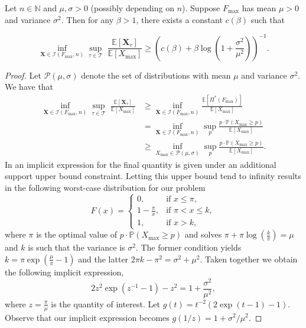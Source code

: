 \documentclass[11pt,a4paper]{article}
\numberwithin{equation}{section}
\newcommand{\N}{\mathbb{N}}
\begin{document}
\begin{theorem}
Let $n \in \N$ and $\mu,\sigma > 0$ (possibly depending on $n$). Suppose $F_{\max}$ has mean $\mu > 0$ and variance $\sigma^2$. Then for any $\beta > 1$, there exists a constant $c(\beta)$ such that 

$$
\inf_{\boldsymbol{X}\in\mathcal{I}(F_{\max}, n)}\sup_{\tau\in\mathcal{T}} \; \frac{\mathbb{E}[\boldsymbol{X}_{\tau}]}{\mathbb{E}[X_{\max}]} \geq  \left(c(\beta)+\beta\log \left(1+\frac{\sigma^2}{\mu^2}\right)\right)^{-1}.
$$
\label{thm:asymptotics-minimax-pricing}
\end{theorem}
\begin{proof}
    Let $\mathcal{P}(\mu,\sigma)$ denote the set of distributions with mean $\mu$ and variance $\sigma^2$. We have that
    \begin{align*}
        \inf_{\boldsymbol{X}\in\mathcal{I}(F_{\max}, n)}\sup_{\tau\in\mathcal{T}} \; \frac{\mathbb{E}[\boldsymbol{X}_{\tau}]}{\mathbb{E}[X_{\max}]}&\ge \inf_{\boldsymbol{X}\in\mathcal{I}(F_{\max}, n)} \frac{\mathbb{E}[\Pi^*(F_{\max})]}{\mathbb{E}[X_{\max}]}\\
        &= \inf_{\boldsymbol{X}\in\mathcal{I}(F_{\max}, n)}\sup_{p} \frac{p\cdot\mathbb{P}(X_{\max}\ge p)}{\mathbb{E}[X_{\max}]}\\
        &\ge \inf_{X_{\max}\in \mathcal{P}(\mu,\sigma)}\sup_{p}\frac{p\cdot\mathbb{P}(X_{\max}\ge p)}{\mathbb{E}[X_{\max}]}.
    \end{align*}
    In \cite{chen2024screening} an implicit expression for the final quantity is given under an additional support upper bound constraint. Letting this upper bound tend to infinity results in the following worst-case distribution for our problem
$$
F(x)=\begin{cases}
    0,&\text{if } x\le \pi,\\
    1-\frac{\pi}{x},&\text{if } \pi < x\le k,\\
    1,&\text{if } x>k,
\end{cases}
$$
where $\pi$ is the optimal value of $p\cdot\mathbb{P}(X_{\max}\ge p)$ and solves $\pi+\pi\log\left(\frac{k}{\pi}\right)=\mu$ and $k$ is such that the variance is $\sigma^2$. The former condition yields $k=\pi\exp\left(\frac{\mu}{\pi}-1\right)$
and the latter $2\pi k - \pi^2=\sigma^2+\mu^2$. 
Taken together we obtain the following implicit expression,
$$
2z^2\exp\left(z^{-1}-1\right)-z^2=1+\frac{\sigma^2}{\mu^2},
$$
where $z=\frac{\pi}{\mu}$ is the quantity of interest.
Let $g(t)= t^{-2}\left(2\exp\left(t-1\right)-1\right)$. Observe that our implicit expression becomes $g(1/z)=1+\sigma^2/\mu^2$.


\end{proof}
\end{document}

